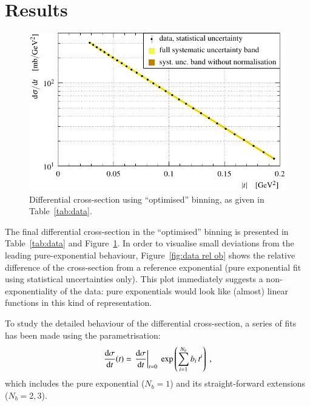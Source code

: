 \section{Results}
\label{sec:results}


\begin{figure}
\begin{center}
\includegraphics{fig/t_dist.pdf}
\caption{%
Differential cross-section using ``optimised'' binning, as given in Table~\ref{tab:data}.
}
\label{fig:data ob}
\end{center}
\end{figure}


The final differential cross-section in the ``optimised'' binning is presented in Table~\ref{tab:data} and \linebreak Figure~\ref{fig:data ob}. In order to visualise small deviations from the leading pure-exponential behaviour, Figure~\ref{fig:data rel ob} shows the relative difference of the cross-section from a reference exponential (pure exponential fit using statistical uncertainties only). This plot immediately suggests a non-exponentiality of the data: pure exponentials would look like (almost) linear functions in this kind of representation.

To study the detailed behaviour of the differential cross-section, a series of fits has been made using the parametrisation:
\begin{equation}
\label{eq:fit param}
{\d\sigma\over\d t}(t) = \left. \d\sigma\over\d t\right|_{t=0} \ \exp\left( \sum\limits_{i = 1}^{N_{b}} b_i\, t^i \right) \ ,
\end{equation}
which includes the pure exponential ($N_b = 1$) and its straight-forward extensions ($N_b = 2, 3$).

